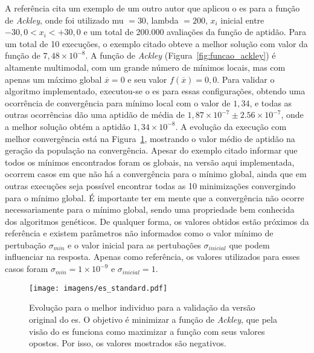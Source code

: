 A referência \cite[pp. 84]{eiben2003introduction} cita um exemplo de um
outro autor que aplicou o \acs{es} para a função de \emph{Ackley},
onde foi utilizado \acs{mu} $= 30$, \acs{lambda} $= 200$, $x_i$
inicial entre $-30,0 < x_i < +30,0$ e um total de 200.000 avaliações
da função de aptidão. Para um total de 10 execuções, o exemplo citado obteve a
melhor solução com valor da função de $7,48\times10^{-8}$. A função de
\emph{Ackley} (Figura~\ref{fig:funcao_ackley}) é altamente multimodal,
com um grande número de mínimos locais, mas com apenas um máximo
global $\overline{x}=0$ e seu valor $f(\overline{x})=0,0$. Para
validar o algoritmo implementado, executou-se o \acs{es} para essas
configurações, obtendo uma ocorrência de convergência para mínimo
local com o valor de $1,34$, e todas as outras ocorrências dão uma
aptidão de média de $1,87\times10^{-7}\pm2.56\times10^{-7}$, onde a
melhor solução obtém a aptidão $1,34\times10^{-8}$. A evolução da
execução com melhor convergência está na Figura~\ref{fig:es_standard},
mostrando o valor médio de aptidão na geração da população na
convergência. Apesar do exemplo citado informar que todos os mínimos
encontrados foram os globais, na versão aqui implementada, ocorrem
casos em que não há a convergência para o mínimo global, ainda que em
outras execuções seja possível encontrar todas as 10 minimizações
convergindo para o mínimo global. É importante ter em mente que a
convergência não ocorre necessariamente para o mínimo global, sendo
uma propriedade bem conhecida dos algoritmos genéticos.  De qualquer
forma, os valores obtidos estão próximos da referência e existem
parâmetros não informados como o valor mínimo de pertubação
$\sigma_{min}$ e o valor inicial para as pertubações
$\sigma_{inicial}$ que podem influenciar na resposta.  Apenas como
referência, os valores utilizados para esses casos foram
$\sigma_{min}=1\times10^{-9}$ e $\sigma_{inicial}=1$.



\begin{figure}[h!t]
\centering
\texttt{[image: imagens/es\_standard.pdf]}
\caption[Evolução para o melhor individuo para a validação da versão
original do ES]{Evolução para o melhor individuo para a validação da versão
original do \acs{es}. O objetivo é minimizar a função de
\emph{Ackley}, que pela visão do \acs{es} funciona como maximizar a
função com seus valores opostos. Por isso, os valores mostrados são
negativos.}
\label{fig:es_standard}
\end{figure}

